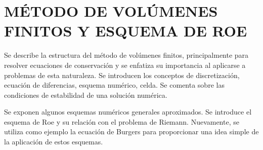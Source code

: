 \chapter{MÉTODO DE VOLÚMENES FINITOS Y ESQUEMA DE ROE}
Se describe la estructura del método de volúmenes finitos, principalmente para resolver ecuaciones de conservación y se enfatiza su importancia al aplicarse a problemas de esta naturaleza. Se introducen los conceptos de discretización, ecuación de diferencias, esquema numérico, celda. Se comenta sobre las condiciones de estabilidad de una solución numérica.

Se exponen algunos esquemas numéricos generales aproximados. Se introduce el esquema de Roe y su relación con el problema de Riemann. Nuevamente, se utiliza como ejemplo la ecuación de Burgers para proporcionar una idea simple de la aplicación de estos esquemas.